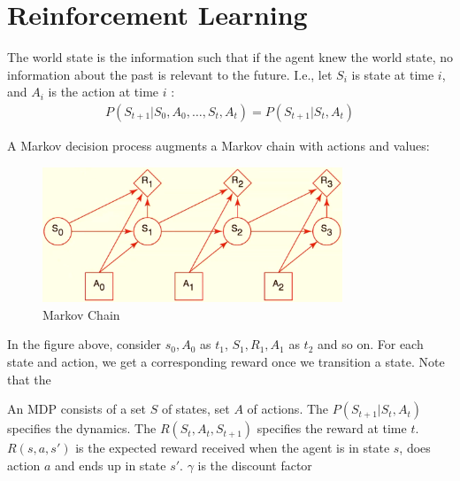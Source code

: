 \documentclass[a4paper]{article}
\theoremstyle{plain}
\theoremstyle{definition}
\newtheorem{defn}{Definition}[section]
\theoremstyle{remark}
\begin{document}
\section{Reinforcement Learning}
\begin{tcolorbox}[colback=black!3!white,colframe=black!60!white,title=\begin{defn}Markov Assumption \label{Markov Assumption}\end{defn}]
The world state is the information such that if the agent knew the world state, no information about the past is relevant to the future. I.e., let $S_i$ is state at time $i$, and $A_i$ is the action at time $i$ :
\begin{align}
P(S_{t+1}|S_0,A_0,\ldots,S_t,A_t) = P(S_{t+1}|S_t,A_t)
\end{align}
\end{tcolorbox}
\begin{tcolorbox}[colback=black!3!white,colframe=black!60!white,title=\begin{defn}Markov Decision Process \label{Markov Decision Process}\end{defn}]
A Markov decision process augments a Markov chain with actions and values:
\begin{figure}[H]
	\centering
	\includegraphics[width=0.8\textwidth]{markov.png}
	\caption{Markov Chain}
	\label{fig:markov-png}
\end{figure}
In the figure above, consider $s_0,A_0$ as $t_1$, $S_1,R_1,A_1$ as $t_2$ and so on. For each state and action, we get a corresponding reward once we transition a state. Note that the
\end{tcolorbox}
\begin{tcolorbox}[colback=black!3!white,colframe=black!60!white,title=\begin{defn}Markov Decision Process \label{Markov Decision Process}\end{defn}]
An MDP consists of a set $S$ of states, set $A$ of actions. The $P(S_{t+1}|S_t,A_t)$ specifies the dynamics. The $R(S_t,A_t,S_{t+1})$ specifies the reward at time $t$. $R(s,a,s')$ is the expected reward received when the agent is in state $s$, does action $a$ and ends up in state $s'$. $\gamma$ is the discount factor
\end{tcolorbox}
\end{document}
